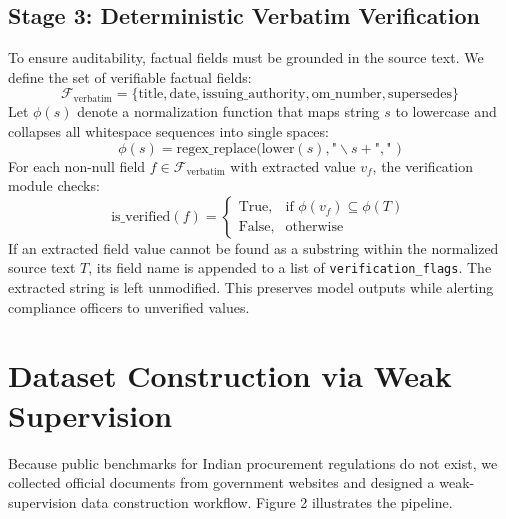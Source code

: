 \documentclass{article}
\begin{document}
\subsection{Stage 3: Deterministic Verbatim Verification}
To ensure auditability, factual fields must be grounded in the source text. We define the set of verifiable factual fields:
\begin{equation}
    \mathcal{F}_{\text{verbatim}} = \{\text{title}, \text{date}, \text{issuing\_authority}, \text{om\_number}, \text{supersedes}\}
\end{equation}
Let $\phi(s)$ denote a normalization function that maps string $s$ to lowercase and collapses all whitespace sequences into single spaces:
\begin{equation}
    \phi(s) = \text{regex\_replace}(\text{lower}(s), \text{"}\backslash s+\text{"}, \text{" }\text{)}
\end{equation}
For each non-null field $f \in \mathcal{F}_{\text{verbatim}}$ with extracted value $v_f$, the verification module checks:
\begin{equation}
    \text{is\_verified}(f) = \begin{cases}
    \text{True}, & \text{if } \phi(v_f) \subseteq \phi(T) \\
    \text{False}, & \text{otherwise}
    \end{cases}
\end{equation}
If an extracted field value cannot be found as a substring within the normalized source text $T$, its field name is appended to a list of \texttt{verification\_flags}. The extracted string is left unmodified. This preserves model outputs while alerting compliance officers to unverified values.

\section{Dataset Construction via Weak Supervision}

Because public benchmarks for Indian procurement regulations do not exist, we collected official documents from government websites and designed a weak-supervision data construction workflow. Figure 2 illustrates the pipeline.
\end{document}
